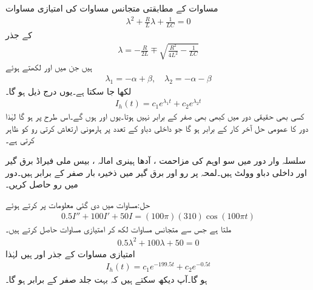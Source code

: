مساوات  کے مطابقتی متجانس مساوات کی امتیازی مساوات
\begin{align*}
\lambda^2+\frac{R}{L}\lambda+\frac{1}{LC}=0
\end{align*}
کے جذر
\begin{align*}
\lambda=-\frac{R}{2L}\mp \sqrt{\frac{R^2}{4L^2}-\frac{1}{LC}}
\end{align*}
ہیں جن میں  اور  لکھتے ہوئے
\begin{align*}
\lambda_1=-\alpha+\beta, \quad \lambda_2=-\alpha-\beta
\end{align*}
لکھا جا سکتا ہے۔یوں  درج ذیل ہو گا۔
\begin{align*}
I_h(t)=c_1e^{\lambda_1 t}+c_2 e^{\lambda_2 t}
\end{align*}
کسی بھی حقیقی دور میں  کبھی بھی صفر کے برابر نہیں ہوتا۔یوں  اور  ہوں گے۔اس طرح  پر  ہو گا لہٰذا  دور کا عمومی حل آخر کار  کے برابر ہو گا جو داخلی دباو کے تعدد  پر ہارمونی ارتعاش کرتی رو کو ظاہر کرتی ہے۔ 

سلسلہ وار  دور میں سو اوہم کی مزاحمت ، آدھا ہینری امالہ  ، بیس ملی فیراڈ برق گیر
   اور داخلی دباو  وولٹ  ہیں۔لمحہ  پر رو اور برق گیر میں ذخیرہ بار صفر کے برابر ہیں۔دور میں رو  حاصل کریں۔

حل:مساوات  میں دی گئی معلومات پر کرتے ہوئے
\begin{align*}
0.5I''+100I'+50I=(100\pi) (310)\cos (100\pi t)
\end{align*}
ملتا ہے جس سے متجانس مساوات  لکھ کر امتیازی مساوات حاصل کرتے ہیں۔
\begin{align*}
0.5\lambda^2+100\lambda+50=0
\end{align*}
امتیازی مساوات کے جذر  اور  ہیں لہٰذا
\begin{align*}
I_h(t)=c_1e^{-199.5t}+c_2e^{-0.5t}
\end{align*}
ہو گا۔آپ دیکھ سکتے ہیں کہ  بہت جلد صفر کے برابر ہو گا۔

